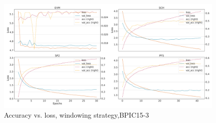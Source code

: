 \begin{figure}[!htb]
    \centering
    \includegraphics[width=\textwidth]{gfx/bpic2015_3/windowed_loss_acc_curve.pdf}
    \caption{Accuracy vs. loss, windowing strategy,BPIC15-3}
\end{figure}
\FloatBarrier

